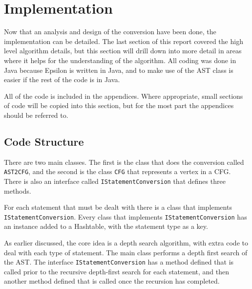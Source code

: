 \section{Implementation}

Now that an analysis and design of the conversion have been done, the implementation can be detailed. The last section of this report covered the high level algorithm details, but this section will drill down into more detail in areas where it helps for the understanding of the algorithm. All coding was done in Java because Epsilon is written in Java, and to make use of the AST class is easier if the rest of the code is in Java.

All of the code is included in the appendices. Where appropriate, small sections of code will be copied into this section, but for the most part the appendices should be referred to.

\subsection{Code Structure}

There are two main classes. The first is the class that does the conversion called \verb|AST2CFG|, and the second is the class \verb|CFG| that represents a vertex in a CFG. There is also an interface called \verb|IStatementConversion| that defines three methods. 

For each statement that must be dealt with there is a class that implements \verb|IStatementConversion|. Every class that implements \verb|IStatementConversion| has an instance added to a Hashtable, with the statement type as a key.

As earlier discussed, the core idea is a depth search algorithm, with extra code to deal with each type of statement. The main class performs a depth first search of the AST. The interface \verb|IStatementConversion| has a method defined that is called prior to the recursive depth-first search for each statement, and then another method defined that is called once the recursion has completed. 


